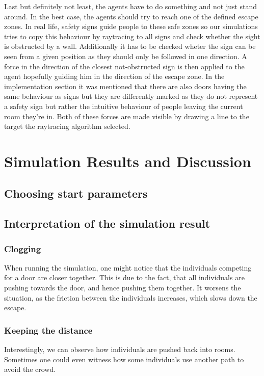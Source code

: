 \documentclass[11pt]{article}
\begin{document}
\begin{itemize}
    Last but definitely not least, the agents have to do something and not just stand around. In the best case, the agents should try to reach one of the defined escape zones. In real life, safety signs guide people to these safe zones so our simulations tries to copy this behaviour by raytracing to all signs and check whether the sight is obstructed by a wall. Additionally it has to be checked wheter the sign can be seen from a given position as they should only be followed in one direction. A force in the direction of the closest not-obstructed sign is then applied to the agent hopefully guiding him in the direction of the escape zone. In the implementation section it was mentioned that there are also doors having the same behaviour as signs but they are differently marked as they do not represent a safety sign but rather the intuitive behaviour of people leaving the current room they're in. Both of these forces are made visible by drawing a line to the target the raytracing algorithm selected.
\end{itemize}

\section{Simulation Results and Discussion}

\subsection{Choosing start parameters}

\subsection{Interpretation of the simulation result}

\subsubsection{Clogging}
When running the simulation, one might notice that the individuals competing for a door are closer together. This is due to the fact, that all individuals are pushing towards the door, and hence pushing them together. It worsens the situation, as the friction between the individuals increases, which slows down the escape.  
    
\subsubsection{Keeping the distance}
Interestingly, we can observe how individuals are pushed back into rooms. Sometimes one could even witness how some individuals use another path to avoid the crowd. 
\end{document}
